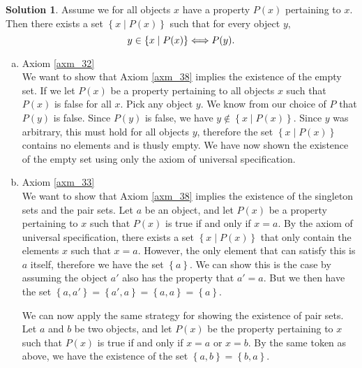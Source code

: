 \documentclass[a4paper, twocolumn]{report}
\theoremstyle{definition}
\theoremstyle{solution}
\newtheorem*{sltn}{Solution}
\begin{document}
\begin{sltn}
  Assume we for all objects $x$ have a property $P(x)$ pertaining to $x$. Then there exists a set
  $\left\{ x \mid P(x) \right\}$ such that for every object $y$, 
  \begin{equation}
    \notag
    y \in \left\{ x \mid P(x) \right\} \Longleftrightarrow P(y).
  \end{equation}

  \begin{enumerate}[(a)]
    \item Axiom \ref{axm_32}\\
      [0.2cm]
      We want to show that Axiom \ref{axm_38} implies the existence of the
      empty set.  If we let $P(x)$ be a property pertaining to all objects $x$
      such that $P(x)$ is false for all $x$.  Pick any object $y$. We know from
      our choice of $P$ that $P(y)$ is false. Since $P(y)$ is false, we have $y
      \notin \left\{ x \mid P(x) \right\}$. Since $y$ was arbitrary, this must
      hold for all objects $y$, therefore the set $\left\{ x \mid P(x)
      \right\}$ contains no elements and is thusly empty. We have now shown the
      existence of the empty set using only the axiom of universal
      specification.

    \item Axiom \ref{axm_33} \\
      [0.2cm]
      We want to show that Axiom \ref{axm_38} implies the existence of the
      singleton sets and the pair sets. Let $a$ be an object, and let $P(x)$ be
      a property pertaining to $x$ such that $P(x)$ is true if and only if $x =
      a$.  By the axiom of universal specification, there exists a set $\left\{
      x \mid P(x) \right\}$ that only contain the elements $x$ such that $x =
      a$. However, the only element that can satisfy this is $a$ itself,
      therefore we have the set $\left\{ a \right\}$. We can show this is the
      case by assuming the object $a'$ also has the property that $a' = a$. But
      we then have the set $\left\{ a, a' \right\} = \left\{ a', a \right\} =
      \left\{ a, a \right\} = \left\{ a \right\}$.

      We can now apply the same strategy for showing the existence of pair
      sets.  Let $a$ and $b$ be two objects, and let $P(x)$ be the property
      pertaining to $x$ such that $P(x)$ is true if and only if $x = a$ or $x =
      b$. By the same token as above, we have the existence of the set $\left\{
      a, b \right\} = \left\{ b, a \right\}$.


\end{enumerate}
\end{sltn}
\end{document}
